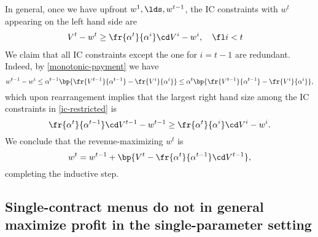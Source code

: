 In general, once we have upfront $w^1,\lds,w^{t-1}$, the IC constraints with $w^t$ appearing on the left hand side are
\begin{align} \label{ic-restricted}
    V^t - w^t &\ge \fr{\alpha^t}{\alpha^i} \cd V^i - w^i,\quad \fl i<t
\end{align}
We claim that all IC constraints except the one for $i=t-1$ are redundant. Indeed, by \cref{monotonic-payment} we have $$w^{t-1} - w^i \le \alpha^{t-1}  \bp{\fr{V^{t-1}}{\alpha^{t-1}} - \fr{V^i}{\alpha^i}} \le \alpha^t \bp{\fr{V^{t-1}}{\alpha^{t-1}} - \fr{V^i}{\alpha^i}},$$ which upon rearrangement implies that the largest right hand size among the IC constraints in \cref{ic-restricted} is $$\fr{\alpha^t}{\alpha^{t-1}} \cd V^{t-1} - w^{t-1} \ge \fr{\alpha^t}{\alpha^i} \cd V^i - w^i.$$ We conclude that the revenue-maximizing $w^t$ is $$w^t = w^{t-1} + \bp{V^t - \fr{\alpha^t}{\alpha^{t-1}} \cd V^{t-1}},$$ completing the inductive step.


\subsection{Single-contract menus do not in general maximize profit in the single-parameter setting} \label{counterexample-profit}

